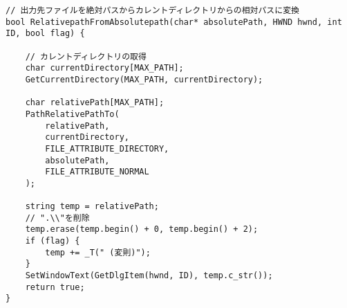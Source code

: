 \begin{lstlisting}[caption=file.cpp]
// 出力先ファイルを絶対パスからカレントディレクトリからの相対パスに変換
bool RelativepathFromAbsolutepath(char* absolutePath, HWND hwnd, int ID, bool flag) {

	// カレントディレクトリの取得
	char currentDirectory[MAX_PATH];
	GetCurrentDirectory(MAX_PATH, currentDirectory);

	char relativePath[MAX_PATH];
	PathRelativePathTo(
		relativePath,
		currentDirectory,
		FILE_ATTRIBUTE_DIRECTORY,
		absolutePath,
		FILE_ATTRIBUTE_NORMAL
	);

	string temp = relativePath;
	// ".\\"を削除
	temp.erase(temp.begin() + 0, temp.begin() + 2);
	if (flag) {
		temp += _T(" (変則)");
	}
	SetWindowText(GetDlgItem(hwnd, ID), temp.c_str());
	return true;
}
\end{lstlisting}

\begin{lstlisting}[caption=main.h]

\end{lstlisting}

\begin{lstlisting}[caption=window.h]
\end{lstlisting}

\begin{lstlisting}[caption=file.h]
\end{lstlisting}

